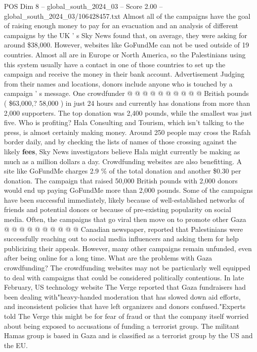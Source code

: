 \begin{textsample}{POS Dim 8 – global\_south\_2024\_03 – Score 2.00 – global\_south\_2024\_03/106428457.txt}
Almost all of the campaigns have the goal of raising enough money to pay for an evacuation and an analysis of different campaigns by the UK ' s Sky News found that, on average, they were asking for around \$38,000.
However, websites like GoFundMe can not be used outside of 19 countries.
Almost all are in Europe or North America, so the Palestinians using this system usually have a contact in one of those countries to set up the campaign and receive the money in their bank account.
Advertisement Judging from their names and locations, donors include anyone who is touched by a campaign ' s message.
One crowdfunder @ @ @ @ @ @ @ @ @ @ British pounds ( \$63,000,? 58,000 ) in just 24 hours and currently has donations from more than 2,000 supporters.
The top donation was 2,400 pounds, while the smallest was just five.
Who is profiting?
Hala Consulting and Tourism, which isn't talking to the press, is almost certainly making money.
Around 250 people may cross the Rafah border daily, and by checking the lists of names of those crossing against the likely \textbf{fees}, Sky News investigators believe Hala might currently be making as much as a million dollars a day.
Crowdfunding websites are also benefitting.
A site like GoFundMe charges 2.9 \% of the total donation and another \$0.30 per donation.
The campaign that raised 50,000 British pounds with 2,000 donors would end up paying GoFundMe more than 2,000 pounds.
Some of the campaigns have been successful immediately, likely because of well-established networks of friends and potential donors or because of pre-existing popularity on social media.
Often, the campaigns that go viral then move on to promote other Gaza @ @ @ @ @ @ @ @ @ @ Canadian newspaper, reported that Palestinians were successfully reaching out to social media influencers and asking them for help publicizing their appeals.
However, many other campaigns remain unfunded, even after being online for a long time.
What are the problems with Gaza crowdfunding?
The crowdfunding websites may not be particularly well equipped to deal with campaigns that could be considered politically contentious.
In late February, US technology website The Verge reported that Gaza fundraisers had been dealing with"heavy-handed moderation that has slowed down aid efforts, and inconsistent policies that have left organizers and donors confused."Experts told The Verge this might be for fear of fraud or that the company itself worried about being exposed to accusations of funding a terrorist group.
The militant Hamas group is based in Gaza and is classified as a terrorist group by the US and the EU.

\end{textsample}
